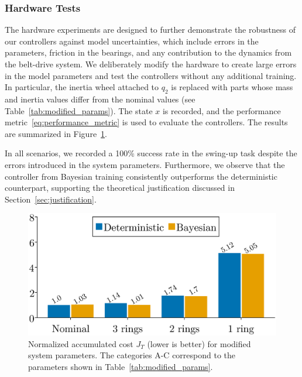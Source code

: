 \subsubsection{Hardware Tests} 

The hardware experiments are designed to further demonstrate the robustness of our
controllers against model uncertainties, which include errors in the parameters,
friction in the bearings, and any contribution to the dynamics from the
belt-drive system.
%
We deliberately modify the hardware to create large errors in the model
parameters and test the controllers without any additional training.
%
In particular, the inertia wheel attached to $q_2$ is replaced with parts whose
mass and inertia values differ from the nominal values (see
Table~\ref{tab:modified_params}). The state $x$ is recorded, and the performance
metric~\eqref{eq:performance_metric} is used to evaluate the controllers.
%
The results are summarized in Figure~\ref{fig:neuralidapbc_bar_plot}.

In all scenarios, we recorded a 100\% success rate in the swing-up task despite
the errors introduced in the system parameters.
%
Furthermore, we observe that the controller from Bayesian training consistently
outperforms the deterministic counterpart, supporting the
theoretical justification discussed in Section~\ref{sec:justification}. 
\begin{figure}[H]
    \centering
    \includegraphics[width=0.6\linewidth]{./figures/idapbc_bar.eps}
    \caption{
        Normalized accumulated cost $J_{T}$ (lower is better) for
        modified system parameters.
        The categories A-C correspond to the parameters shown in
        Table~\ref{tab:modified_params}.
    }
    \label{fig:neuralidapbc_bar_plot}
\end{figure}
%

